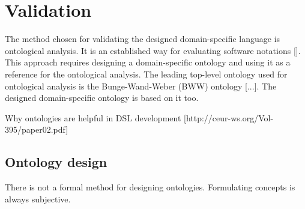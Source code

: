 \documentclass[parskip=full]{uvamscse}
\begin{document}
\section{Validation}

The method chosen for validating the designed domain-specific language is ontological analysis. It is an established way for evaluating software notations []. This approach requires designing a domain-specific ontology and using it as a reference for the ontological analysis. The leading top-level ontology used for ontological analysis is the Bunge-Wand-Weber (BWW) ontology [...]. The designed domain-specific ontology is based on it too.

Why ontologies are helpful in DSL development [http://ceur-ws.org/Vol-395/paper02.pdf]

\subsection{Ontology design}

There is not a formal method for designing ontologies. Formulating concepts is always subjective. 
\end{document}
